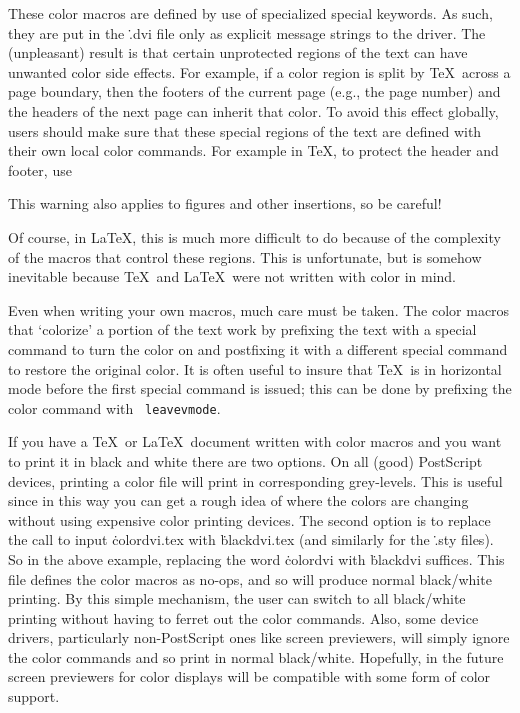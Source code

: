 These color macros are defined by use of specialized \.{\ttbackslash
special} keywords.  As such, they are put in the \.{.dvi} file only as
explicit message strings to the driver.  The (unpleasant)
result is that certain unprotected regions of the text can have
unwanted color side effects.  For example, if a color region is split
by \TeX\ across a page boundary, then the footers of the current page
(e.g., the page number) and the headers of the next page can inherit
that color.  To avoid this effect globally, users should make sure
that these special regions of the text are defined with their own
local color commands.  For example in \TeX, to protect the header and
footer, use 

This warning also applies to figures and other insertions, so be
careful!

Of course, in La\TeX, this is much more difficult to do because of the
complexity of the macros that control these regions.  This is
unfortunate, but is somehow inevitable because \TeX\ and La\TeX\ were
not written with color in mind.

Even when writing your own macros, much care must be taken.  The
color macros that `colorize' a portion of the text work by prefixing
the text with a special command to turn the color on and postfixing it
with a different special command to restore the original color.
It is often useful to insure that \TeX\ is in horizontal mode before
the first special command is issued; this can be done by prefixing the
color command with {\tt{} leavevmode}.


If you have a \TeX\ or La\TeX\ document written with color macros and
you want to print it in black and white there are two options.  On all
(good) PostScript devices, printing a color file will print in
corresponding grey-levels.  This is useful since in this way you can
get a rough idea of where the colors are changing without using
expensive color printing devices.  The second option is to replace the
call to input \.{colordvi.tex} with \.{blackdvi.tex} (and similarly for the
\.{.sty} files).  So in the above example, replacing the word
\.{colordvi} with \.{blackdvi} suffices.  This file defines the color macros
as no-ops, and so will produce normal black/white printing.  By this
simple mechanism, the user can switch to all black/white printing
without having to ferret out the color commands.  Also, some device
drivers, particularly non-PostScript ones like screen previewers, will
simply ignore the color commands and so print in normal black/white.
Hopefully, in the future screen previewers for color displays will be
compatible with some form of color support.

